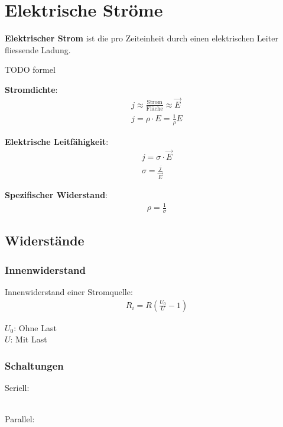 \section{Elektrische Ströme}

\textbf{Elektrischer Strom} ist die pro Zeiteinheit durch einen elektrischen Leiter
fliessende Ladung.

TODO formel

\textbf{Stromdichte}:
\begin{align}
	& j \approx \frac{\textrm{Strom}}{\textrm{Fläche}} \approx \vec{E} \\
	& j = \rho \cdot E = \frac{1}{\rho}E
\end{align}

\textbf{Elektrische Leitfähigkeit}:
\begin{align}
	& j = \sigma \cdot \vec{E} \\
	& \sigma = \frac{j}{\vec{E}}
\end{align}

\textbf{Spezifischer Widerstand}:
\begin{align}
	& \rho = \frac{1}{\sigma}
\end{align}

\subsection{Widerstände}

\subsubsection{Innenwiderstand}

Innenwiderstand einer Stromquelle:
\begin{align}
	& R_i = R \left(\frac{U_0}{U} - 1\right)
\end{align}

$U_0$: Ohne Last\\
$U$: Mit Last

\subsubsection{Schaltungen}

\begin{minipage}[t]{.5\linewidth}
	Seriell:\\\\
	
\end{minipage}
\begin{minipage}[t]{.5\linewidth}
	Parallel:\\\\
	
\end{minipage}


